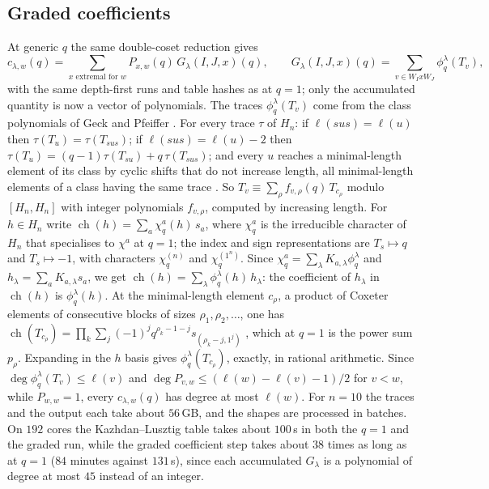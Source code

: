 \documentclass[11pt]{amsart}
\theoremstyle{definition}
\theoremstyle{remark}
\DeclareMathOperator{\ch}{ch}
\begin{document}
\subsection{Graded coefficients}\label{sec:graded}
At generic $q$ the same double-coset reduction gives
\begin{equation}\label{eq:qcoeff}
c_{\lambda,w}(q)=\sum_{x\text{ extremal for }w}P_{x,w}(q)\,G_\lambda(I,J,x)(q),\qquad G_\lambda(I,J,x)(q)=\sum_{v\in W_IxW_J}\phi^\lambda_q(T_v),
\end{equation}
with the same depth-first runs and table hashes as at $q=1$; only the accumulated quantity is now a vector of polynomials. The traces $\phi^\lambda_q(T_v)$ come from the class polynomials of Geck and Pfeiffer \cite[Ch.~8]{GP}. For every trace $\tau$ of $H_n$: if $\ell(sus)=\ell(u)$ then $\tau(T_u)=\tau(T_{sus})$; if $\ell(sus)=\ell(u)-2$ then $\tau(T_u)=(q-1)\tau(T_{su})+q\,\tau(T_{sus})$; and every $u$ reaches a minimal-length element of its class by cyclic shifts that do not increase length, all minimal-length elements of a class having the same trace \cite[Thms.~3.2.9, 8.2.3]{GP}. So $T_v\equiv\sum_\rho f_{v,\rho}(q)\,T_{c_\rho}$ modulo $[H_n,H_n]$ with integer polynomials $f_{v,\rho}$, computed by increasing length. For $h\in H_n$ write $\ch(h)=\sum_a\chi^a_q(h)\,s_a$, where $\chi^a_q$ is the irreducible character of $H_n$ that specialises to $\chi^a$ at $q=1$; the index and sign representations are $T_s\mapsto q$ and $T_s\mapsto-1$, with characters $\chi^{(n)}_q$ and $\chi^{(1^n)}_q$. Since $\chi^a_q=\sum_\lambda K_{a,\lambda}\phi^\lambda_q$ and $h_\lambda=\sum_aK_{a,\lambda}s_a$, we get $\ch(h)=\sum_\lambda\phi^\lambda_q(h)\,h_\lambda$: the coefficient of $h_\lambda$ in $\ch(h)$ is $\phi^\lambda_q(h)$. At the minimal-length element $c_\rho$, a product of Coxeter elements of consecutive blocks of sizes $\rho_1,\rho_2,\dots$, one has $\ch(T_{c_\rho})=\prod_k\sum_j(-1)^jq^{\rho_k-1-j}s_{(\rho_k-j,1^j)}$ \cite{Ram}, which at $q=1$ is the power sum $p_\rho$. Expanding in the $h$ basis gives $\phi^\lambda_q(T_{c_\rho})$, exactly, in rational arithmetic. Since $\deg\phi^\lambda_q(T_v)\le\ell(v)$ and $\deg P_{v,w}\le(\ell(w)-\ell(v)-1)/2$ for $v<w$, while $P_{w,w}=1$, every $c_{\lambda,w}(q)$ has degree at most $\ell(w)$. For $n=10$ the traces and the output each take about $56$\,GB, and the shapes are processed in batches. On $192$ cores the Kazhdan--Lusztig table takes about $100$\,s in both the $q=1$ and the graded run, while the graded coefficient step takes about $38$ times as long as at $q=1$ ($84$ minutes against $131$\,s), since each accumulated $G_\lambda$ is a polynomial of degree at most $45$ instead of an integer.
\end{document}
